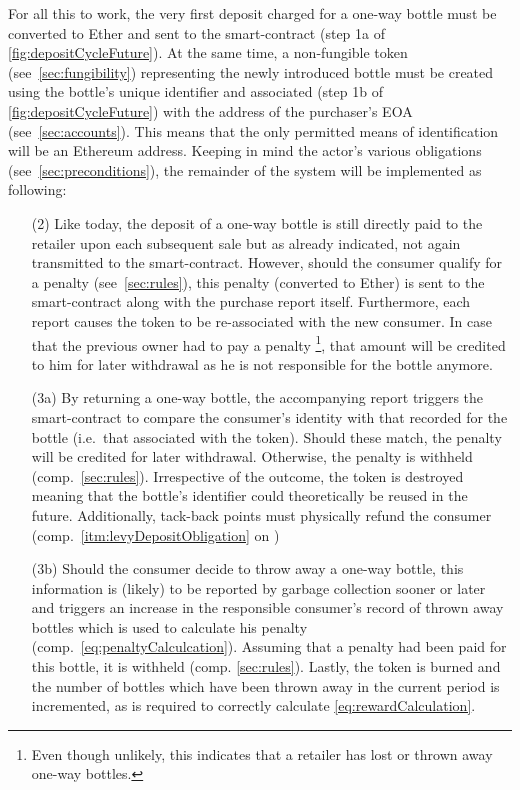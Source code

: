 For all this to work, the very first deposit charged for a one-way bottle must be converted to Ether and sent to the smart-contract (step 1a of \autoref{fig:depositCycleFuture})\label{itm:basicRequirement}. At the same time, a non-fungible token (see~\ref{sec:fungibility}) representing the newly introduced bottle must be created using the bottle's unique identifier and associated (step 1b of \autoref{fig:depositCycleFuture}) with the address of the purchaser's \ac{EOA} (see~\ref{sec:accounts}). This means that the only permitted means of identification will be an Ethereum address. Keeping in mind the actor's various obligations (see~\ref{sec:preconditions}), the remainder of the system will be implemented as following: 

\begin{itemize}
	\item [(2)] Like today, the deposit of a one-way bottle is still directly paid to the retailer upon each subsequent sale but as already indicated, not again transmitted to the smart-contract. However, should the consumer qualify for a penalty (see~\ref{sec:rules}), this penalty (converted to Ether) is sent to the smart-contract along with the purchase report itself. Furthermore, each report causes the token to be re-associated with the new consumer. In case that the previous owner had to pay a penalty \footnote{Even though unlikely, this indicates that a retailer has lost or thrown away one-way bottles.}, that amount will be credited to him for later withdrawal as he is not responsible for the bottle anymore.
	\item [(3a)] By returning a one-way bottle, the accompanying report triggers the smart-contract to compare the consumer's identity with that recorded for the bottle (i.e.~that associated with the token). Should these match, the penalty will be credited for later withdrawal. Otherwise, the penalty is withheld (comp.~\ref{sec:rules}). Irrespective of the outcome, the token is destroyed meaning that the bottle's identifier could theoretically be reused in the future. Additionally, tack-back points must physically refund the consumer (comp.~\ref{itm:levyDepositObligation} on )
	\item [(3b)] Should the consumer decide to throw away a one-way bottle, this information is (likely) to be reported by garbage collection sooner or later and triggers an increase in the responsible consumer's record of thrown away bottles which is used to calculate his penalty (comp.~\autoref{eq:penaltyCalculcation}). Assuming that a penalty had been paid for this bottle, it is withheld (comp. \ref{sec:rules}). Lastly, the token is burned and the number of bottles which have been thrown away in the current period is incremented, as is required to correctly calculate \autoref{eq:rewardCalculation}.

\end{itemize}
